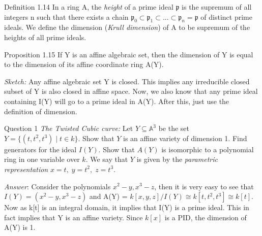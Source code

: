 \documentclass[12pt]{article}
\begin{document}
\begin{definitionBox}{Definition 1.14}
    In a ring A, the \textit{height} of a prime ideal $\mathfrak{p}$ is the supremum of all integers n such that there exists a chain $\mathfrak{p}_{0} \subset \mathfrak{p}_{1} \subset ... \subset \mathfrak{p}_{n} = \mathfrak{p}$ of distinct prime ideals. We define the dimension (\textit{Krull dimension}) of A to be supremum of the heights of all prime ideals.
\end{definitionBox}
\begin{propositionBox}{Proposition 1.15}
    If Y is an affine algebraic set, then the dimension of Y is equal to the dimension of its affine coordinate ring A(Y).
\end{propositionBox}
\textit{Sketch:} Any affine algebraic set Y is closed. This implies any irreducible closed subset of Y is also closed in affine space. Now, we also know that any prime ideal containing I(Y) will go to a prime ideal in A(Y). After this, just use the definition of dimension. \\

\begin{exampleBox}{Question 1}
\textit{The Twisted Cubic curve: }Let \( Y \subseteq \mathbb{A}^3 \) be the set \( Y = \{ (t, t^2, t^3) \mid t \in k \} \). Show that \( Y \) is an affine variety of dimension 1. Find generators for the ideal \( I(Y) \). Show that \( A(Y) \) is isomorphic to a polynomial ring in one variable over \( k \). We say that \( Y \) is given by the \textit{parametric representation} \( x = t,\; y = t^2,\; z = t^3 \).
\end{exampleBox}
\textit{Answer}: Consider the polynomials $x^2 -y, x^3 -z$, then it is very easy to see that $I(Y) = (x^2 - y, x^3 - z)$ and A(Y) = $k[x,y,z]/I(Y) \cong k[t,t^2,t^3] \cong k[t]$. Now as k[t] is an integral domain, it implies that I(Y) is a prime ideal. This in fact implies that Y is an affine variety. Since $k[x]$ is a PID, the dimension of A(Y) is 1.
\end{document}

